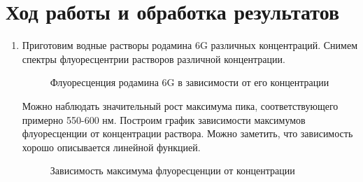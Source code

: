 \documentclass[a4paper,12pt]{article}
\begin{document}
\newpage
\section*{Ход работы и обработка результатов}

\begin{enumerate}
    \subsection*{Задание 1. Исследование зависимости спектров поглощения и флуоресценции растворов родамина 6G от концентрации}

\item Приготовим водные растворы родамина 6G различных концентраций. Снимем спектры флуоресцентрии растворов различной концентрации.
\begin{figure}[h!]
\caption{Флуоресценция родамина 6G в зависимости от его концентрации}
\end{figure}

Можно наблюдать значительный рост максимума пика, соответствующего примерно 550-600 нм.
Построим график зависимости максимумов флуоресценции от концентрации раствора. Можно заметить, что зависимость хорошо описывается линейной функцией.

\begin{figure}[h!]
\caption{Зависимость максимума флуоресценции от концентрации}
\end{figure}


\end{enumerate}
\end{document}
